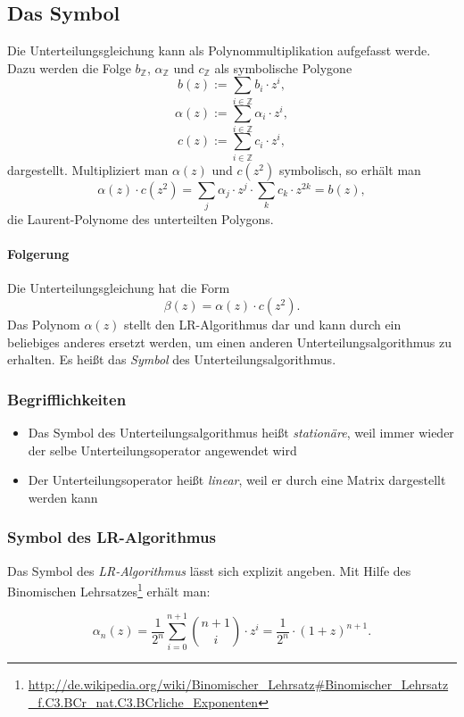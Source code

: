 \subsection{Das Symbol}
Die Unterteilungsgleichung kann als Polynommultiplikation aufgefasst werde. Dazu werden die Folge \(b_{\mathbb{Z}}\), \(\alpha_{\mathbb{Z}}\) und \(c_{\mathbb{Z}}\) als symbolische Polygone
\[b(z) := \sum_{i \in \mathbb{Z}} b_i \cdot z^i,\]
\[\alpha(z) := \sum_{i \in \mathbb{Z}} \alpha_i \cdot z^i,\]
\[c(z) := \sum_{i \in \mathbb{Z}} c_i \cdot z^i,\]
dargestellt. Multipliziert man \(\alpha(z)\) und \(c(z^2)\) symbolisch, so erhält man
\[\alpha(z) \cdot c(z^2) = \sum_j \alpha_j\cdot z^j \cdot \sum_k c_k\cdot z^{2k} = b(z),\]
die Laurent-Polynome des unterteilten Polygons.

\paragraph{Folgerung} Die Unterteilungsgleichung hat die Form
\[\beta(z) = \alpha(z)\cdot c(z^2).\]
Das Polynom \(\alpha(z)\) stellt den LR-Algorithmus dar und kann durch ein beliebiges anderes ersetzt werden, um einen anderen Unterteilungsalgorithmus zu erhalten. Es heißt das \textit{Symbol} des Unterteilungsalgorithmus.

\subsubsection{Begrifflichkeiten}
\begin{itemize}
	\item Das Symbol des Unterteilungsalgorithmus heißt \textit{stationäre}, weil immer wieder der selbe Unterteilungsoperator angewendet wird
	\item Der Unterteilungsoperator heißt \textit{linear}, weil er durch eine Matrix dargestellt werden kann
\end{itemize}

\subsubsection{Symbol des LR-Algorithmus}
Das Symbol des \textit{LR-Algorithmus} lässt sich explizit angeben. Mit Hilfe des Binomischen Lehrsatzes\footnote{\url{http://de.wikipedia.org/wiki/Binomischer_Lehrsatz\#Binomischer_Lehrsatz_f.C3.BCr_nat.C3.BCrliche_Exponenten}} erhält man:

\[\alpha_n(z) = \frac{1}{2^n} \sum_{i=0}^{n+1} \binom{n+1}{i} \cdot z^i = \frac{1}{2^n}\cdot (1+z)^{n+1}.\]


